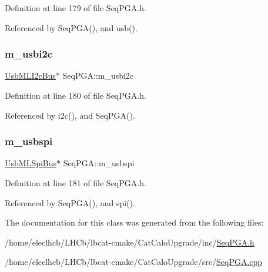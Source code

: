 Definition at line 179 of file Seq\+P\+G\+A.\+h.



Referenced by Seq\+P\+G\+A(), and usb().

\mbox{\label{classSeqPGA_a31d692cdc2f70dfd71671f3e2d688e20}} 
\subsubsection{\texorpdfstring{m\+\_\+usbi2c}{m\_usbi2c}}
{\footnotesize\ttfamily \hyperlink{classUsbMLI2cBus}{Usb\+M\+L\+I2c\+Bus}$\ast$ Seq\+P\+G\+A\+::m\+\_\+usbi2c\hspace{0.3cm}{\ttfamily [private]}}



Definition at line 180 of file Seq\+P\+G\+A.\+h.



Referenced by i2c(), and Seq\+P\+G\+A().

\mbox{\label{classSeqPGA_aeb7d559e042bced959366125781cef39}} 
\subsubsection{\texorpdfstring{m\+\_\+usbspi}{m\_usbspi}}
{\footnotesize\ttfamily \hyperlink{classUsbMLSpiBus}{Usb\+M\+L\+Spi\+Bus}$\ast$ Seq\+P\+G\+A\+::m\+\_\+usbspi\hspace{0.3cm}{\ttfamily [private]}}



Definition at line 181 of file Seq\+P\+G\+A.\+h.



Referenced by Seq\+P\+G\+A(), and spi().



The documentation for this class was generated from the following files\+:\begin{DoxyCompactItemize}
\item 
/home/eleclhcb/\+L\+H\+Cb/lbcat-\/cmake/\+Cat\+Calo\+Upgrade/inc/\hyperlink{SeqPGA_8h}{Seq\+P\+G\+A.\+h}\item 
/home/eleclhcb/\+L\+H\+Cb/lbcat-\/cmake/\+Cat\+Calo\+Upgrade/src/\hyperlink{SeqPGA_8cpp}{Seq\+P\+G\+A.\+cpp}\end{DoxyCompactItemize}
